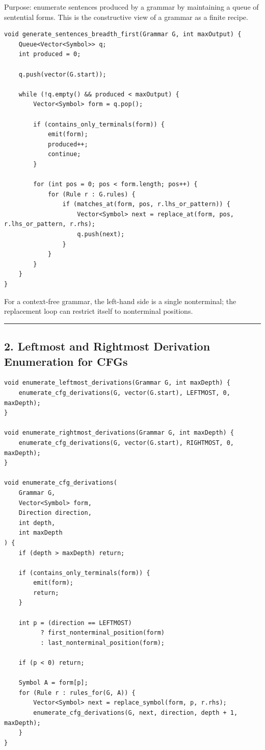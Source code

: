 \documentclass[10pt,letterpaper]{article}
\begin{document}
Purpose: enumerate sentences produced by a grammar by maintaining a queue of sentential forms. This is the constructive view of a grammar as a finite recipe.

\begin{verbatim}
void generate_sentences_breadth_first(Grammar G, int maxOutput) {
    Queue<Vector<Symbol>> q;
    int produced = 0;

    q.push(vector(G.start));

    while (!q.empty() && produced < maxOutput) {
        Vector<Symbol> form = q.pop();

        if (contains_only_terminals(form)) {
            emit(form);
            produced++;
            continue;
        }

        for (int pos = 0; pos < form.length; pos++) {
            for (Rule r : G.rules) {
                if (matches_at(form, pos, r.lhs_or_pattern)) {
                    Vector<Symbol> next = replace_at(form, pos, r.lhs_or_pattern, r.rhs);
                    q.push(next);
                }
            }
        }
    }
}
\end{verbatim}

For a context-free grammar, the left-hand side is a single nonterminal; the replacement loop can restrict itself to nonterminal positions.

\medskip\hrule\medskip

\subsection*{2. Leftmost and Rightmost Derivation Enumeration for CFGs}

\begin{verbatim}
void enumerate_leftmost_derivations(Grammar G, int maxDepth) {
    enumerate_cfg_derivations(G, vector(G.start), LEFTMOST, 0, maxDepth);
}

void enumerate_rightmost_derivations(Grammar G, int maxDepth) {
    enumerate_cfg_derivations(G, vector(G.start), RIGHTMOST, 0, maxDepth);
}

void enumerate_cfg_derivations(
    Grammar G,
    Vector<Symbol> form,
    Direction direction,
    int depth,
    int maxDepth
) {
    if (depth > maxDepth) return;

    if (contains_only_terminals(form)) {
        emit(form);
        return;
    }

    int p = (direction == LEFTMOST)
          ? first_nonterminal_position(form)
          : last_nonterminal_position(form);

    if (p < 0) return;

    Symbol A = form[p];
    for (Rule r : rules_for(G, A)) {
        Vector<Symbol> next = replace_symbol(form, p, r.rhs);
        enumerate_cfg_derivations(G, next, direction, depth + 1, maxDepth);
    }
}
\end{verbatim}
\end{document}
